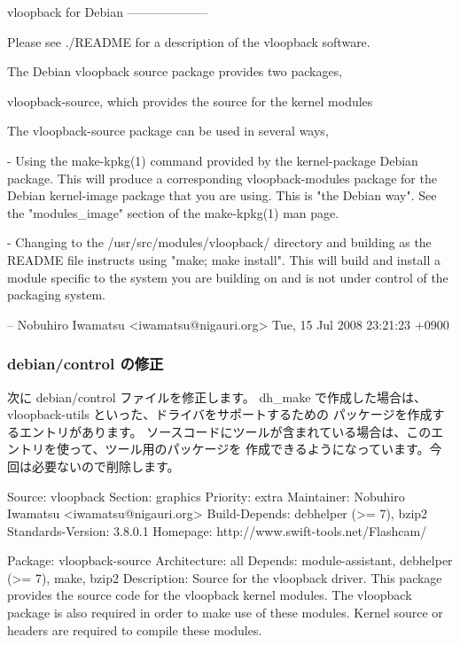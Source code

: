 \documentclass[mingoth,a4paper]{jsarticle}
\begin{document}
\begin{commandline}
vloopback for Debian
--------------------

Please see ./README for a description of the vloopback software.

The Debian vloopback source package provides two packages,

 vloopback-source, which provides the source for the kernel modules

The vloopback-source package can be used in several ways,

 - Using the make-kpkg(1) command provided by the kernel-package Debian
   package. This will produce a corresponding vloopback-modules package for
   the Debian kernel-image package that you are using. This is "the Debian
   way". See the "modules_image" section of the make-kpkg(1) man page.

 - Changing to the /usr/src/modules/vloopback/ directory and building as
   the README file instructs using "make; make install". This will build
   and install a module specific to the system you are building on and is
   not under control of the packaging system.

 -- Nobuhiro Iwamatsu <iwamatsu@nigauri.org>  Tue, 15 Jul 2008 23:21:23 +0900
\end{commandline}

\subsubsection{debian/control の修正}
次に debian/control ファイルを修正します。
dh\_make で作成した場合は、vloopback-utils といった、ドライバをサポートするための
パッケージを作成するエントリがあります。
ソースコードにツールが含まれている場合は、このエントリを使って、ツール用のパッケージを
作成できるようになっています。今回は必要ないので削除します。

\begin{commandline}
Source: vloopback
Section: graphics
Priority: extra
Maintainer: Nobuhiro Iwamatsu <iwamatsu@nigauri.org>
Build-Depends: debhelper (>= 7), bzip2
Standards-Version: 3.8.0.1
Homepage: http://www.swift-tools.net/Flashcam/

Package: vloopback-source
Architecture: all
Depends: module-assistant, debhelper (>= 7), make, bzip2
Description: Source for the vloopback driver.
 This package provides the source code for the vloopback kernel modules.
 The vloopback package is also required in order to make use of these
 modules. Kernel source or headers are required to compile these modules.
\end{commandline}
\end{document}

